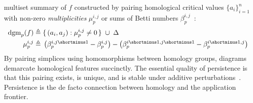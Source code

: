 \documentclass[10pt twocolumn]{article}
\numberwithin{equation}{section}
\newcommand{\+}{%
	\raisebox{0.18ex}{\scaleobj{0.55}{+}}
}
\theoremstyle{definition}
\theoremstyle{definition}
\begin{document}
\begin{multicols}{2}
multiset summary of $f$ constructed by pairing homological critical values $\{ a_i \}_{i=1}^n$ with non-zero \emph{multiplicities} $\mu_p^{i,j}$ or sums of Betti numbers $\beta_p^{i,j}$~\cite{cohen2005stability}: 
\begin{align*}
	\mathrm{dgm}_p(f) \triangleq & \; \{ \, (a_i, a_j) :  \mu_p^{i,j} \neq 0 \, \} \; \cup \; \Delta \\
\mu_p^{i,j} \triangleq & \; \left(\beta_p^{i,j\shortminus1} - \beta_p^{i,j} \right) - \left(\beta_p^{i\shortminus1,j\shortminus1} - \beta_p^{i\shortminus1,j} \right)
\end{align*}\label{eq:dgm}
\noindent
By pairing simplices using homomorphisms between homology groups, diagrams demarcate homological features succinctly.
The essential quality of persistence is that this pairing exists, is unique, and is stable under additive perturbations~\cite{cohen2005stability}.
Persistence is the de facto connection between homology and the application frontier.


\end{multicols}
\end{document}
